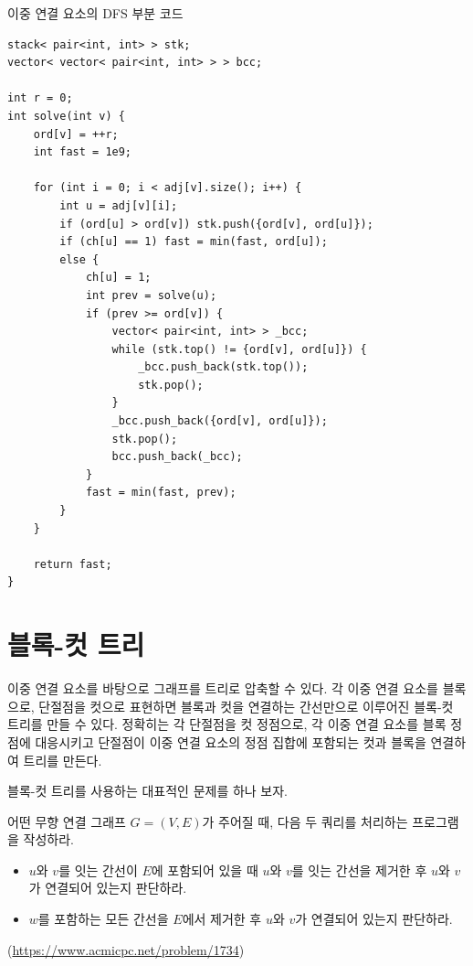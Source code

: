 \begin{code} \label{code: bcc}
이중 연결 요소의 DFS 부분 코드
\begin{lstlisting}
stack< pair<int, int> > stk;
vector< vector< pair<int, int> > > bcc;

int r = 0;
int solve(int v) {
    ord[v] = ++r;
    int fast = 1e9;
    
    for (int i = 0; i < adj[v].size(); i++) {
        int u = adj[v][i];
        if (ord[u] > ord[v]) stk.push({ord[v], ord[u]});
        if (ch[u] == 1) fast = min(fast, ord[u]);
        else {
            ch[u] = 1;
            int prev = solve(u);
            if (prev >= ord[v]) {
                vector< pair<int, int> > _bcc;
                while (stk.top() != {ord[v], ord[u]}) {
                    _bcc.push_back(stk.top());
                    stk.pop();
                }
                _bcc.push_back({ord[v], ord[u]});
                stk.pop();
                bcc.push_back(_bcc);
            }
            fast = min(fast, prev);
        }
    }
    
    return fast;
}
\end{lstlisting}
\end{code}

\section{블록-컷 트리}
이중 연결 요소를 바탕으로 그래프를 트리로 압축할 수 있다. 각 이중 연결 요소를 블록으로, 단절점을 컷으로 표현하면 블록과 컷을 연결하는 간선만으로 이루어진 블록-컷 트리를 만들 수 있다. 정확히는 각 단절점을 컷 정점으로, 각 이중 연결 요소를 블록 정점에 대응시키고 단절점이 이중 연결 요소의 정점 집합에 포함되는 컷과 블록을 연결하여 트리를 만든다.

블록-컷 트리를 사용하는 대표적인 문제를 하나 보자.
\begin{example} \label{ex: block-cut}
    어떤 무향 연결 그래프 $G=(V, E)$가 주어질 때, 다음 두 쿼리를 처리하는 프로그램을 작성하라.

    \begin{itemize}
        \item $u$와 $v$를 잇는 간선이 $E$에 포함되어 있을 때 $u$와 $v$를 잇는 간선을 제거한 후 $u$와 $v$가 연결되어 있는지 판단하라.
        \item $w$를 포함하는 모든 간선을 $E$에서 제거한 후 $u$와 $v$가 연결되어 있는지 판단하라.
    \end{itemize}

    (\url{https://www.acmicpc.net/problem/1734})
\end{example}

